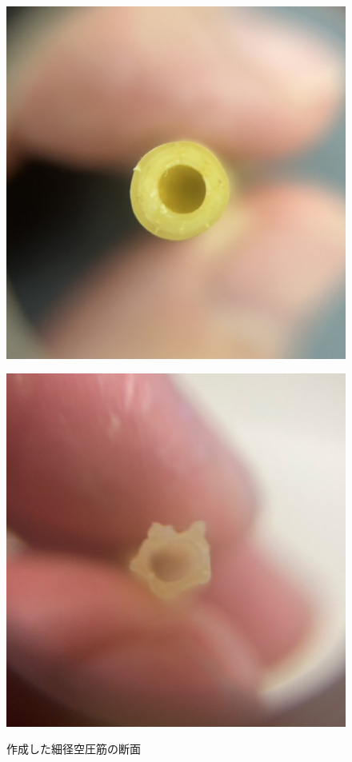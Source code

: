 \begin{figure}[h]
  \centering
  \begin{minipage}{0.49\textwidth}
      \centering
      \includegraphics[scale=0.3]{pic/O.jpg}
      \label{fig:44}
  \end{minipage} \hfill
  \begin{minipage}{0.49\textwidth}
      \centering
      \includegraphics[scale=0.3]{pic/P.jpg}
      \label{fig:55}
  \end{minipage} 
  \caption{作成した細径空圧筋の断面}
  \label{fig:mmm}
\end{figure}

